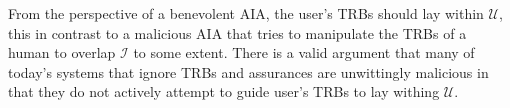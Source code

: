     From the perspective of a benevolent AIA, the user's TRBs should lay within $\mathcal{U}$, this in contrast to a malicious AIA that tries to manipulate the TRBs of a human to overlap $\mathcal{I}$ to some extent. There is a valid argument that many of today's systems that ignore TRBs and assurances are unwittingly malicious in that they do not actively attempt to guide user's TRBs to lay withing $\mathcal{U}$.


    

%
